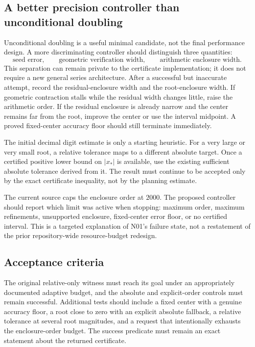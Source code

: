 \documentclass[11pt,letterpaper]{article}
\begin{document}
\subsection{A better precision controller than unconditional doubling}
Unconditional doubling is a useful minimal candidate, not the final performance design. A more discriminating controller should distinguish three quantities:
\begin{equation}
 \text{seed error},\qquad
 \text{geometric verification width},\qquad
 \text{arithmetic enclosure width}.
\end{equation}
This separation can remain private to the certificate implementation; it does not require a new general series architecture. After a successful but inaccurate attempt, record the residual-enclosure width and the root-enclosure width. If geometric contraction stalls while the residual width changes little, raise the arithmetic order. If the residual enclosure is already narrow and the center remains far from the root, improve the center or use the interval midpoint. A proved fixed-center accuracy floor should still terminate immediately.

The initial decimal digit estimate is only a starting heuristic. For a very large or very small root, a relative tolerance maps to a different absolute target. Once a certified positive lower bound on $|x_*|$ is available, use the existing sufficient absolute tolerance derived from it. The result must continue to be accepted only by the exact certificate inequality, not by the planning estimate.

The current source caps the enclosure order at $2000$. The proposed controller should report which limit was active when stopping: maximum order, maximum refinements, unsupported enclosure, fixed-center error floor, or no certified interval. This is a targeted explanation of N01's failure state, not a restatement of the prior repository-wide resource-budget redesign.

\subsection{Acceptance criteria}
The original relative-only witness must reach its goal under an appropriately documented adaptive budget, and the absolute and explicit-order controls must remain successful. Additional tests should include a fixed center with a genuine accuracy floor, a root close to zero with an explicit absolute fallback, a relative tolerance at several root magnitudes, and a request that intentionally exhausts the enclosure-order budget. The success predicate must remain an exact statement about the returned certificate.
\end{document}
